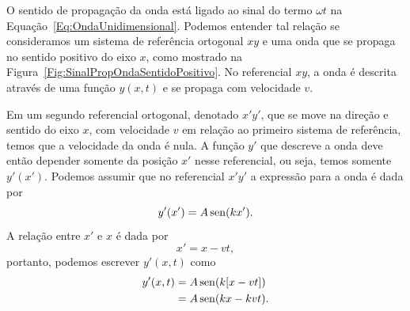 O sentido de propagação da onda está ligado ao sinal do termo $\omega t$ na Equação~\eqref{Eq:OndaUnidimensional}. Podemos entender tal relação se consideramos um sistema de referência ortogonal $xy$ e uma onda que se propaga no sentido positivo do eixo $x$, como mostrado na Figura~\ref{Fig:SinalPropOndaSentidoPositivo}. No referencial $xy$, a onda é descrita através de uma função $y(x,t)$ e se propaga com velocidade $v$.

\begin{marginfigure}[2cm]
\centering
{}
\caption{Para uma onda que se propaga no sentido positivo de $x$, a relação entre as coordenadas $x$ e $x'$ é $x' = x - vt$.\label{Fig:SinalPropOndaSentidoPositivo}}
\end{marginfigure}

Em um segundo referencial ortogonal, denotado $x'y'$, que se move na direção e sentido do eixo $x$, com velocidade $v$ em relação ao primeiro sistema de referência, temos que a velocidade da onda é nula. A função $y'$ que descreve a onda deve então depender somente da posição $x'$ nesse referencial, ou seja, temos somente $y'(x')$. Podemos assumir que no referencial $x'y'$ a expressão para a onda é dada por
\begin{equation}
    y'(x') = A\operatorname{sen}(kx').
\end{equation}
%
A relação entre $x'$ e $x$ é dada por
\begin{equation}
    x' = x - vt,
\end{equation}
%
portanto, podemos escrever $y'(x,t)$ como
\begin{align}
    y'(x,t) &= A\operatorname{sen}(k[x - vt]) \\
    &= A\operatorname{sen}(kx - kvt).
\end{align}    

